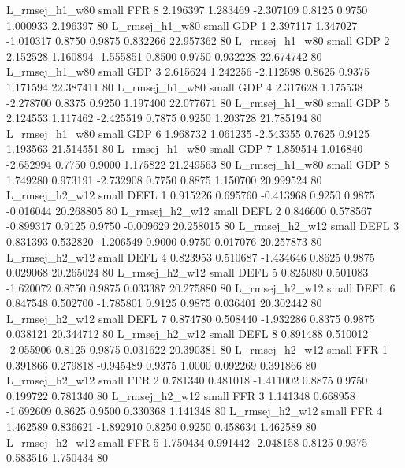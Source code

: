 L_rmsej_h1_w80      small      FFR                 8 2.196397 1.283469 -2.307109 0.8125 0.9750  1.000933    2.196397 80
L_rmsej_h1_w80      small      GDP                 1 2.397117 1.347027 -1.010317 0.8750 0.9875  0.832266   22.957362 80
L_rmsej_h1_w80      small      GDP                 2 2.152528 1.160894 -1.555851 0.8500 0.9750  0.932228   22.674742 80
L_rmsej_h1_w80      small      GDP                 3 2.615624 1.242256 -2.112598 0.8625 0.9375  1.171594   22.387411 80
L_rmsej_h1_w80      small      GDP                 4 2.317628 1.175538 -2.278700 0.8375 0.9250  1.197400   22.077671 80
L_rmsej_h1_w80      small      GDP                 5 2.124553 1.117462 -2.425519 0.7875 0.9250  1.203728   21.785194 80
L_rmsej_h1_w80      small      GDP                 6 1.968732 1.061235 -2.543355 0.7625 0.9125  1.193563   21.514551 80
L_rmsej_h1_w80      small      GDP                 7 1.859514 1.016840 -2.652994 0.7750 0.9000  1.175822   21.249563 80
L_rmsej_h1_w80      small      GDP                 8 1.749280 0.973191 -2.732908 0.7750 0.8875  1.150700   20.999524 80
L_rmsej_h2_w12      small     DEFL                 1 0.915226 0.695760 -0.413968 0.9250 0.9875 -0.016044   20.268805 80
L_rmsej_h2_w12      small     DEFL                 2 0.846600 0.578567 -0.899317 0.9125 0.9750 -0.009629   20.258015 80
L_rmsej_h2_w12      small     DEFL                 3 0.831393 0.532820 -1.206549 0.9000 0.9750  0.017076   20.257873 80
L_rmsej_h2_w12      small     DEFL                 4 0.823953 0.510687 -1.434646 0.8625 0.9875  0.029068   20.265024 80
L_rmsej_h2_w12      small     DEFL                 5 0.825080 0.501083 -1.620072 0.8750 0.9875  0.033387   20.275880 80
L_rmsej_h2_w12      small     DEFL                 6 0.847548 0.502700 -1.785801 0.9125 0.9875  0.036401   20.302442 80
L_rmsej_h2_w12      small     DEFL                 7 0.874780 0.508440 -1.932286 0.8375 0.9875  0.038121   20.344712 80
L_rmsej_h2_w12      small     DEFL                 8 0.891488 0.510012 -2.055906 0.8125 0.9875  0.031622   20.390381 80
L_rmsej_h2_w12      small      FFR                 1 0.391866 0.279818 -0.945489 0.9375 1.0000  0.092269    0.391866 80
L_rmsej_h2_w12      small      FFR                 2 0.781340 0.481018 -1.411002 0.8875 0.9750  0.199722    0.781340 80
L_rmsej_h2_w12      small      FFR                 3 1.141348 0.668958 -1.692609 0.8625 0.9500  0.330368    1.141348 80
L_rmsej_h2_w12      small      FFR                 4 1.462589 0.836621 -1.892910 0.8250 0.9250  0.458634    1.462589 80
L_rmsej_h2_w12      small      FFR                 5 1.750434 0.991442 -2.048158 0.8125 0.9375  0.583516    1.750434 80
